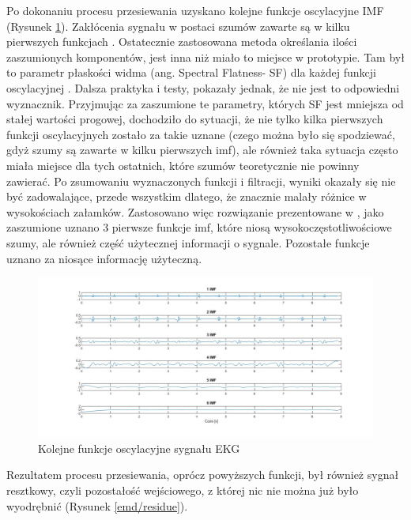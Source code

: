 \documentclass[a4paper]{article}
\begin{document}
Po dokonaniu procesu przesiewania uzyskano kolejne funkcje oscylacyjne IMF (Rysunek \ref{emd/IMFS}).  Zakłócenia sygnału w postaci szumów zawarte są w kilku pierwszych funkcjach \cite{2, 3}. Ostatecznie zastosowana metoda określania ilości zaszumionych komponentów, jest inna niż miało to miejsce w prototypie. Tam był to parametr płaskości widma (ang. Spectral Flatness- SF) dla każdej funkcji oscylacyjnej \cite{2}. Dalsza praktyka i testy, pokazały jednak, że nie jest to odpowiedni wyznacznik. Przyjmując za zaszumione te parametry, których SF jest mniejsza od stałej wartości progowej, dochodziło do sytuacji, że nie tylko kilka pierwszych funkcji oscylacyjnych zostało za takie uznane (czego można było się spodziewać, gdyż szumy są zawarte w kilku pierwszych imf), ale również taka sytuacja często miała miejsce dla tych ostatnich, które szumów teoretycznie nie powinny zawierać. Po zsumowaniu wyznaczonych funkcji i filtracji, wyniki okazały się nie być zadowalające, przede wszystkim dlatego, że znacznie malały różnice w wysokościach załamków. 
Zastosowano więc rozwiązanie prezentowane w \cite{1}, jako zaszumione uznano 3 pierwsze funkcje imf, które niosą wysokoczęstotliwościowe szumy, ale również część użytecznej informacji o sygnale. Pozostałe funkcje uznano za niosące informację użyteczną. 

\begin{figure}[H]
\centering
\includegraphics[scale=0.35]{emd/IMFS}
\caption{\label{emd/IMFS}Kolejne funkcje oscylacyjne sygnału EKG}
\end{figure}

Rezultatem procesu przesiewania, oprócz powyższych funkcji, był również sygnał resztkowy, czyli pozostałość wejściowego, z której nic nie można już było wyodrębnić (Rysunek \ref{emd/residue}). 
\end{document}
